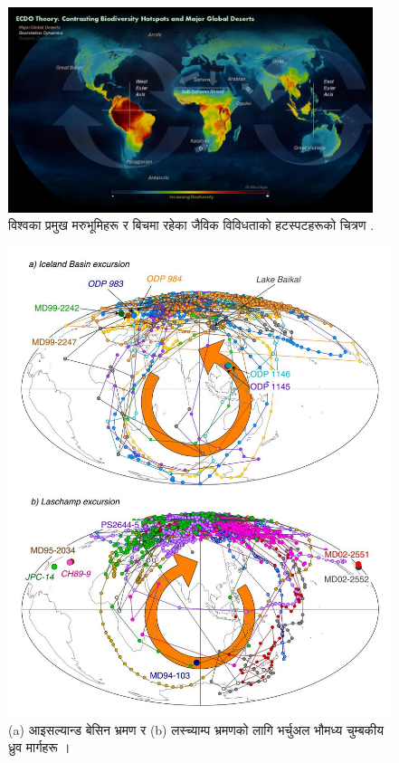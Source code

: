 \documentclass[10pt,twocolumn,letterpaper]{article}
\begin{document}
\begin{figure}[t]
\begin{center}
\includegraphics[width=0.95\textwidth]{biodiversity.jpg}
\end{center}
   \caption{विश्वका प्रमुख मरुभूमिहरू र बिचमा रहेका जैविक विविधताको हटस्पटहरूको चित्रण \cite{28}.}
\label{fig:9}
\end{figure}
\begin{figure}[t]
\begin{center}
   \includegraphics[width=0.95\linewidth]{laj.jpg}
\end{center}
   \caption{(a) आइसल्यान्ड बेसिन भ्रमण र (b) लस्च्याम्प भ्रमणको लागि भर्चुअल भौमध्य चुम्बकीय ध्रुव मार्गहरू \cite{35}।}
\label{fig:7}
\label{fig:onecol}
\end{figure}
\end{document}
